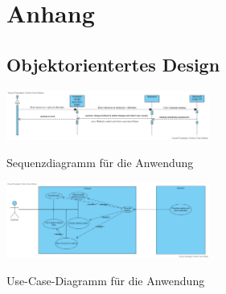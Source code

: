 
\section{Anhang}\label{sec:anhang}
\newline
\newline
\subsection{Objektorientertes Design}\label{subsec:objektorientiertes-design}
\newline
\newline
\par\vspace{1cm}
\centering
\includegraphics[width=0.5\textwidth]{Bilder/Objektorientiertes Design/Sequence diagram for ressource booking (3)}
\caption{Sequenzdiagramm für die Anwendung}
\label{fig:sequence-diagramm}
\newline
\newline
\par\vspace{1cm}
\centering
\includegraphics[width=0.5\textwidth]{Bilder/Objektorientiertes Design/Use Case diagram ressource booking}
\caption{Use-Case-Diagramm für die Anwendung}
\label{fig:use-case-diagramm}
\newline
\newline
\newpage
